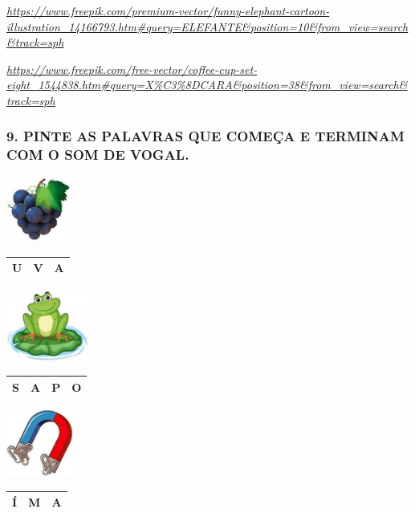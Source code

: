 \href{https://www.freepik.com/premium-vector/funny-elephant-cartoon-illustration_14166793.htm\#query=ELEFANTE\&position=10\&from_view=search\&track=sph}{\emph{https://www.freepik.com/premium-vector/funny-elephant-cartoon-illustration\_14166793.htm\#query=ELEFANTE\&position=10\&from\_view=search\&track=sph}}

\href{https://www.freepik.com/free-vector/coffee-cup-set-eight_1544838.htm\#query=X\%C3\%8DCARA\&position=38\&from_view=search\&track=sph}{\emph{https://www.freepik.com/free-vector/coffee-cup-set-eight\_1544838.htm\#query=X\%C3\%8DCARA\&position=38\&from\_view=search\&track=sph}}

\subsubsection{9. PINTE AS PALAVRAS QUE COMEÇA E TERMINAM COM O SOM DE
VOGAL.}\label{pinte-as-palavras-que-comeuxe7a-e-terminam-com-o-som-de-vogal.}

\includegraphics[width=0.83333in,height=0.84004in]{media/image38.jpg}

\begin{longtable}[]{@{}lll@{}}
\toprule
U & V & A\tabularnewline
\bottomrule
\end{longtable}

\includegraphics[width=1.06463in,height=0.91667in]{media/image39.jpg}

\begin{longtable}[]{@{}llll@{}}
\toprule
S & A & P & O\tabularnewline
\bottomrule
\end{longtable}

\includegraphics[width=0.86458in,height=0.86667in]{media/image40.jpg}

\begin{longtable}[]{@{}lll@{}}
\toprule
Í & M & A\tabularnewline
\bottomrule
\end{longtable}

